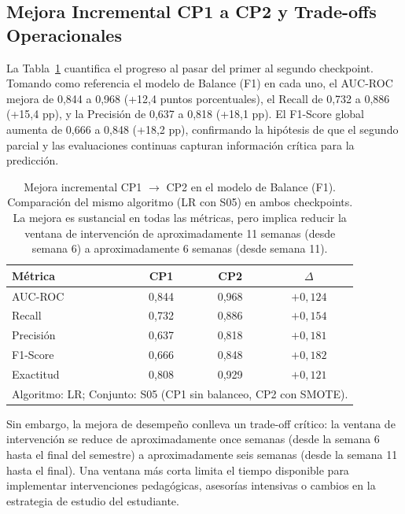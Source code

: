 \documentclass[12pt, letterpaper, openany]{report}
\begin{document}
\FloatBarrier

\subsection{Mejora Incremental CP1 a CP2 y Trade-offs Operacionales}

La Tabla~\ref{tab:mejora_incremental} cuantifica el progreso al pasar del primer al segundo checkpoint. Tomando como referencia el modelo de Balance (F1) en cada uno, el AUC-ROC mejora de 0,844 a 0,968 (+12,4 puntos porcentuales), el Recall de 0,732 a 0,886 (+15,4 pp), y la Precisión de 0,637 a 0,818 (+18,1 pp). El F1-Score global aumenta de 0,666 a 0,848 (+18,2 pp), confirmando la hipótesis de que el segundo parcial y las evaluaciones continuas capturan información crítica para la predicción.

\begin{table}[!htbp]
  \centering
  \caption{Mejora incremental CP1 $\to$ CP2 en el modelo de Balance (F1). Comparación del mismo algoritmo (LR con S05) en ambos checkpoints. La mejora es sustancial en todas las métricas, pero implica reducir la ventana de intervención de aproximadamente 11 semanas (desde semana 6) a aproximadamente 6 semanas (desde semana 11).}
  \label{tab:mejora_incremental}
  \small
  \begin{tabular}{lccc}
    \toprule
    Métrica & CP1 & CP2 & $\Delta$ \\
    \midrule
    AUC-ROC   & 0,844 & 0,968 & $+0{,}124$ \\
    Recall    & 0,732 & 0,886 & $+0{,}154$ \\
    Precisión & 0,637 & 0,818 & $+0{,}181$ \\
    F1-Score  & 0,666 & 0,848 & $+0{,}182$ \\
    Exactitud & 0,808 & 0,929 & $+0{,}121$ \\
    \bottomrule
    \multicolumn{4}{l}{\footnotesize Algoritmo: LR; Conjunto: S05 (CP1 sin balanceo, CP2 con SMOTE).} \\
  \end{tabular}
\end{table}

Sin embargo, la mejora de desempeño conlleva un trade-off crítico: la ventana de intervención se reduce de aproximadamente once semanas (desde la semana 6 hasta el final del semestre) a aproximadamente seis semanas (desde la semana 11 hasta el final). Una ventana más corta limita el tiempo disponible para implementar intervenciones pedagógicas, asesorías intensivas o cambios en la estrategia de estudio del estudiante.
\end{document}
